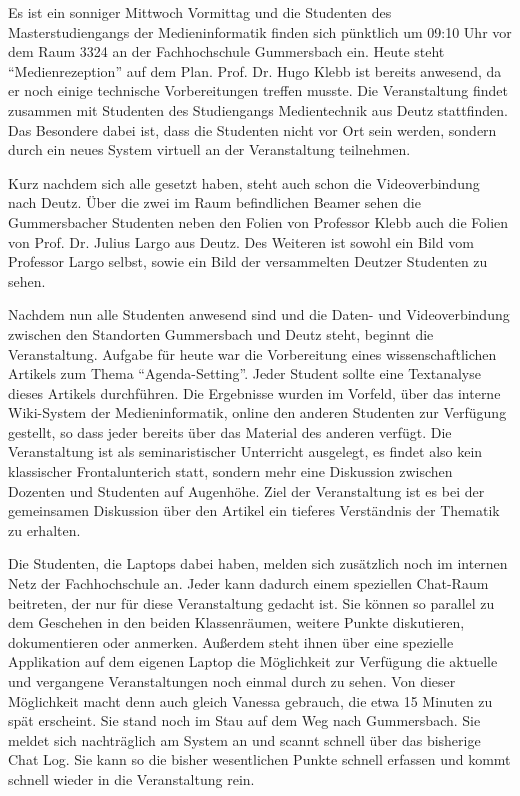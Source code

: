 \begin{framed}

  Es ist ein sonniger Mittwoch Vormittag und die Studenten des Masterstudiengangs der Medieninformatik finden sich pünktlich um 09:10 Uhr vor dem Raum 3324 an der Fachhochschule Gummersbach ein. Heute steht "`Medienrezeption"' auf dem Plan. Prof. Dr. Hugo Klebb ist bereits anwesend, da er noch einige technische Vorbereitungen treffen musste. Die Veranstaltung  findet zusammen mit Studenten des Studiengangs Medientechnik aus Deutz stattfinden. Das Besondere dabei ist, dass die Studenten nicht vor Ort sein werden, sondern durch ein neues System virtuell an der Veranstaltung teilnehmen.

  Kurz nachdem sich alle gesetzt haben, steht auch schon die Videoverbindung nach Deutz. Über die zwei im Raum befindlichen Beamer sehen die Gummersbacher Studenten neben den Folien von Professor Klebb auch die Folien von Prof. Dr. Julius Largo aus Deutz. Des Weiteren ist sowohl ein Bild vom Professor Largo selbst, sowie ein Bild der versammelten Deutzer Studenten zu sehen.
  
  Nachdem nun alle Studenten anwesend sind und die Daten- und Videoverbindung zwischen den Standorten Gummersbach und Deutz steht, beginnt die Veranstaltung. Aufgabe für heute war die Vorbereitung eines wissenschaftlichen Artikels zum Thema "`Agenda-Setting"'. Jeder Student sollte eine Textanalyse dieses Artikels durchführen. Die Ergebnisse wurden im Vorfeld, über das interne Wiki-System der Medieninformatik, online den anderen Studenten zur Verfügung gestellt, so dass jeder bereits über das Material des anderen verfügt. Die Veranstaltung ist als seminaristischer Unterricht ausgelegt, es findet also kein klassischer Frontalunterich statt, sondern mehr eine Diskussion zwischen Dozenten und Studenten auf Augenhöhe. Ziel der Veranstaltung ist es bei der gemeinsamen Diskussion über den Artikel ein tieferes Verständnis der Thematik zu erhalten.

  Die Studenten, die Laptops dabei haben, melden sich zusätzlich noch im internen Netz der Fachhochschule an. Jeder kann dadurch einem speziellen Chat-Raum beitreten, der nur für diese Veranstaltung gedacht ist. Sie können so parallel zu dem Geschehen in den beiden Klassenräumen, weitere Punkte diskutieren, dokumentieren oder anmerken. Außerdem steht ihnen über eine spezielle Applikation auf dem eigenen Laptop die Möglichkeit zur Verfügung die aktuelle und vergangene Veranstaltungen noch einmal durch zu sehen. Von dieser Möglichkeit macht denn auch gleich Vanessa gebrauch, die etwa 15 Minuten zu spät erscheint. Sie stand noch im Stau auf dem Weg nach Gummersbach. Sie meldet sich nachträglich am System an und scannt schnell über das bisherige Chat Log. Sie kann so die bisher wesentlichen Punkte schnell erfassen und kommt schnell wieder in die Veranstaltung rein.


\end{framed}

